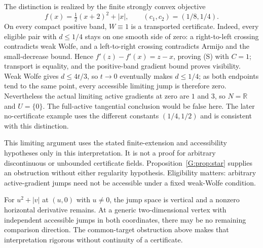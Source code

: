 The distinction is realized by the finite strongly convex objective
\[
 f(x)=\tfrac12(x+2)^2+|x|,
 \qquad (c_1,c_2)=(1/8,1/4).
\]
On every compact positive band, $W\equiv1$ is a transported certificate. Indeed, every eligible pair with $d\le1/4$ stays on one smooth side of zero: a right-to-left crossing contradicts weak Wolfe, and a left-to-right crossing contradicts Armijo and the small-decrease bound. Hence $f'(z)-f'(x)=z-x$, proving (S) with $C=1$; transport is equality, and the positive-band gradient bound proves visibility. Weak Wolfe gives $d\le4t/3$, so $t\to0$ eventually makes $d\le1/4$; as both endpoints tend to the same point, every accessible limiting jump is therefore zero. Nevertheless the actual limiting active gradients at zero are $1$ and $3$, so $N=\mathbb R$ and $U=\{0\}$. The full-active tangential conclusion would be false here. The later no-certificate example uses the different constants $(1/4,1/2)$ and is consistent with this distinction.

This limiting argument uses the stated finite-extension and accessibility hypotheses only in this interpretation. It is not a proof for arbitrary discontinuous or unbounded certificate fields. Proposition~\ref{G:prop:star} supplies an obstruction without either regularity hypothesis. Eligibility matters: arbitrary active-gradient jumps need not be accessible under a fixed weak-Wolfe condition.

For $u^2+|v|$ at $(u,0)$ with $u\ne0$, the jump space is vertical and a nonzero horizontal derivative remains. At a generic two-dimensional vertex with independent accessible jumps in both coordinates, there may be no remaining comparison direction. The common-target obstruction above makes that interpretation rigorous without continuity of a certificate.


\setcounter{section}{5}
\setcounter{theorem}{0}
\setcounter{equation}{5}


